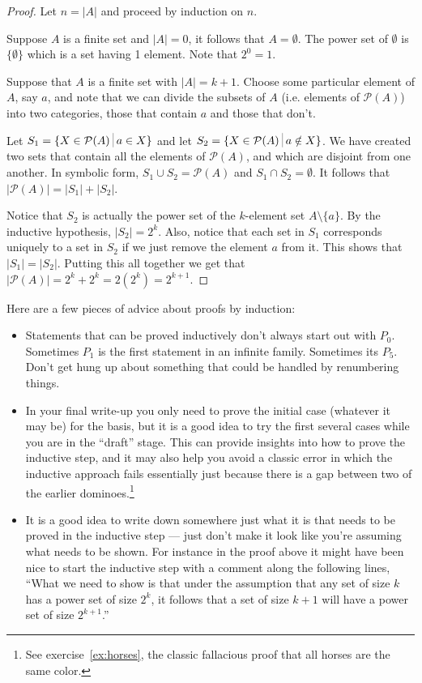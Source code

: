 \begin{proof}
Let $n = |A|$ and proceed by induction on $n$.

 Suppose $A$ is a finite set and $|A| = 0$, it follows 
that $A = \emptyset$.  The power set of $\emptyset$ is $\{ \emptyset \}$ 
which is a set having 1 element.  Note that $2^0 = 1$.
   
  Suppose that $A$ is a finite set with $|A| = k+1$.  Choose some particular element of $A$, say $a$, and note that
we can divide the subsets of $A$ (i.e. elements of ${\mathcal P}(A)$) into
two categories, those that contain $a$ and those that don't.

Let $S_1 = \{ X \in {\mathcal P}(A) \suchthat a \in X \}$ and let
$S_2 = \{ X \in {\mathcal P}(A) \suchthat a \notin X \}$.  We have 
created two sets that contain all the elements of ${\mathcal P}(A)$,
and which are disjoint from one another.  In symbolic form, 
$S_1 \cup S_2 = {\mathcal P}(A)$ and $S_1 \cap S_2 = \emptyset$.
It follows that $|{\mathcal P}(A)| = |S_1| + |S_2|$.  

Notice that $S_2$ is actually the power set of the $k$-element set
$A \setminus \{ a \}$.  By the inductive hypothesis, $|S_2| = 2^k$.
Also, notice that each set in $S_1$ corresponds uniquely to a set in
$S_2$ if we just remove the element $a$ from it.  This shows that 
$|S_1| = |S_2|$.  Putting this all together we get that 
$|{\mathcal P}(A)| = 2^k + 2^k = 2(2^k) = 2^{k+1}$.

\end{proof}

Here are a few pieces
of advice about proofs by induction:

\begin{itemize}
\item Statements that can be proved inductively don't always start out with 
$P_0$.  Sometimes $P_1$ is the first statement in an infinite family.
Sometimes its $P_5$.  Don't get hung up about something that could be
handled by renumbering things.  
\item In your final write-up you only need to prove the initial case
(whatever it may be) for the basis, but it is a good idea to try 
the first several cases while you are in the ``draft'' stage.  This
can provide insights into how to prove the inductive step, and it may
also help you avoid a classic error in which the inductive approach fails
essentially just because there is a gap between two of the earlier 
dominoes.\footnote{See exercise~\ref{ex:horses}, the classic fallacious proof that all horses are the same color.}
\item It is a good idea to write down somewhere just what it is that
needs to be proved in the inductive step --- just don't make it look like 
you're assuming what needs to be shown.  For instance in the proof above
it might have been nice to start the inductive step with a comment along
the following lines, ``What we need to show is that under the assumption
that any set of size $k$ has a power set of size $2^k$, it follows that
a set of size $k+1$ will have a power set of size $2^{k+1}$.'' 
\end{itemize}
\medskip

